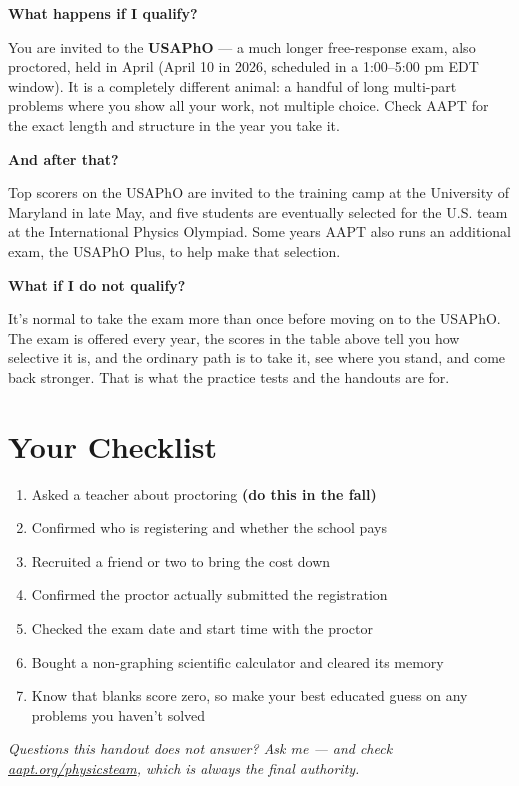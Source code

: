 \documentclass[11pt]{article}
\newcommand{\Q}[1]{\par\medskip\noindent\textbf{\color{qblue}#1}\par\nobreak\vspace{1pt}\nobreak}
\begin{document}
\Q{What happens if I qualify?}
You are invited to the \textbf{USAPhO} --- a much longer free-response exam, also
proctored, held in April (April 10 in 2026, scheduled in a 1:00--5:00 pm EDT window). It is
a completely different animal: a handful of long multi-part problems where you show all
your work, not multiple choice. Check AAPT for the exact length and structure in the year
you take it.

\Q{And after that?}
Top scorers on the USAPhO are invited to the training camp at the University of Maryland in
late May, and five students are eventually selected for the U.S. team at the International
Physics Olympiad. Some years AAPT also runs an additional exam, the USAPhO Plus, to help
make that selection.

\Q{What if I do not qualify?}
It's normal to take the exam more than once before moving on to the USAPhO. The exam is
offered every year, the scores in the table above tell you how selective it is, and the
ordinary path is to take it, see where you stand, and come back stronger. That is what the
practice tests and the handouts are for.

\section{Your Checklist}

\begin{keybox}
\begin{enumerate}\setlength{\itemsep}{2pt}
\item[$\square$] Asked a teacher about proctoring \textbf{(do this in the fall)}
\item[$\square$] Confirmed who is registering and whether the school pays
\item[$\square$] Recruited a friend or two to bring the cost down
\item[$\square$] Confirmed the proctor actually submitted the registration
\item[$\square$] Checked the exam date and start time with the proctor
\item[$\square$] Bought a non-graphing scientific calculator and cleared its memory
\item[$\square$] Know that blanks score zero, so make your best educated guess on any
problems you haven't solved
\end{enumerate}
\end{keybox}

\vspace{0.5em}
\begin{center}
\emph{Questions this handout does not answer? Ask me --- and check
\href{https://www.aapt.org/physicsteam/}{aapt.org/physicsteam}, which is always the final
authority.}
\end{center}
\end{document}
